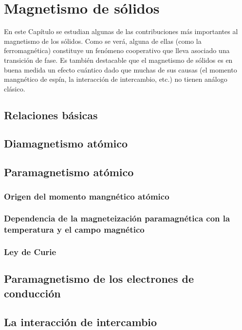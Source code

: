 \chapter{Magnetismo de sólidos} \label{Ch:10}

En este Capítulo se estudian algunas de las contribuciones más importantes al magnetismo de los sólidos. Como se verá, alguna de ellas (como la ferromagnética) constituye un fenómeno cooperativo que lleva asociado una transición de fase. Es también destacable que el magnetismo de sólidos es en buena medida un efecto cuántico dado que muchas de sus causas (el momento mangnético de espín, la interacción de intercambio, etc.) no tienen análogo clásico.

\section{Relaciones básicas}


\section{Diamagnetismo atómico}

\section{Paramagnetismo atómico}

\subsection{Origen del momento mangnético atómico}

\subsection[Dependencia de la magnetización respecto $\vec{\Bn}$ y $T$]{Dependencia de la magneteización paramagnética con la temperatura y el campo magnético}

\subsection{Ley de Curie}

\section{Paramagnetismo de los electrones de conducción}

\section{La interacción de intercambio}

